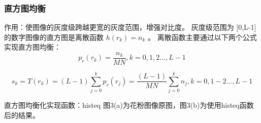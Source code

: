 \documentclass[notheorems,serif,table,compress]{beamer}  %
\begin{document}
\begin{frame}
\frametitle{直方图均衡}
   作用：使图像的灰度级跨越更宽的灰度范围，增强对比度。
   灰度级范围为 [0,L-1] 的数字图像的直方图是离散函数 $h(r_{k})=n_{k}$ 。
   离散函数主要通过以下两个公式实现直方图均衡：
   \begin{equation}    \label{3.8} %
    p_{r}(r_{k})= \frac{n_{k}}{MN},k=0,1,2\ldots,L-1
   \end{equation}

   \begin{equation} \label {3.9}
     s_{k}=T(r_{k})=(L-1)\sum_{j=0}^{k}p_{r}(r_{j})=\frac{(L-1)}{MN} \sum_    {j=0}^{k}{n_{j}},k=0,1-2\ldots,L-1
   \end{equation}
 \end{frame}
 直方图均衡化实现函数：histeq
 图3(a)为花粉图像原图，图3(b)为使用histeq函数后的结果。
\end{document}
